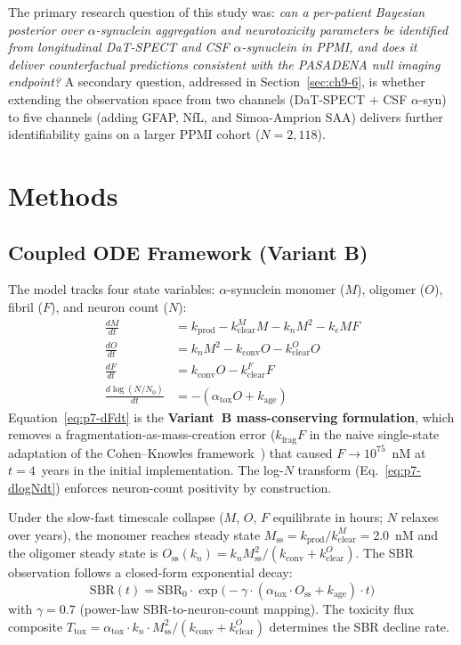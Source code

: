 The primary research question of this study was: \emph{can a per-patient Bayesian posterior over $\alpha$-synuclein aggregation and neurotoxicity parameters be identified from longitudinal DaT-SPECT and CSF $\alpha$-synuclein in PPMI, and does it deliver counterfactual predictions consistent with the PASADENA null imaging endpoint?} A secondary question, addressed in Section~\ref{sec:ch9-6}, is whether extending the observation space from two channels (DaT-SPECT + CSF $\alpha$-syn) to five channels (adding GFAP, NfL, and Simoa-Amprion SAA) delivers further identifiability gains on a larger PPMI cohort ($N = 2{,}118$).


\section{Methods}
\label{sec:p7-methods}

\subsection{Coupled ODE Framework (Variant B)}

The model tracks four state variables: $\alpha$-synuclein monomer ($M$), oligomer ($O$), fibril ($F$), and neuron count ($N$):
\begin{align}
\frac{dM}{dt} &= k_\text{prod} - k_\text{clear}^M M - k_n M^2 - k_e M F \label{eq:p7-dMdt} \\
\frac{dO}{dt} &= k_n M^2 - k_\text{conv} O - k_\text{clear}^O O \label{eq:p7-dOdt} \\
\frac{dF}{dt} &= k_\text{conv} O - k_\text{clear}^F F \label{eq:p7-dFdt} \\
\frac{d\log(N/N_0)}{dt} &= -(\alpha_\text{tox} O + k_\text{age}) \label{eq:p7-dlogNdt}
\end{align}
Equation~\eqref{eq:p7-dFdt} is the \textbf{Variant~B mass-conserving formulation}, which removes a fragmentation-as-mass-creation error ($k_\text{frag} F$ in the naive single-state adaptation of the Cohen--Knowles framework~\cite{cohen2012,knowles2009}) that caused $F \to 10^{75}$~nM at $t=4$~years in the initial implementation. The log-$N$ transform (Eq.~\eqref{eq:p7-dlogNdt}) enforces neuron-count positivity by construction.

Under the slow-fast timescale collapse ($M$, $O$, $F$ equilibrate in hours; $N$ relaxes over years), the monomer reaches steady state $M_\text{ss} = k_\text{prod}/k_\text{clear}^M = 2.0$~nM and the oligomer steady state is $O_\text{ss}(k_n) = k_n M_\text{ss}^2 / (k_\text{conv} + k_\text{clear}^O)$. The SBR observation follows a closed-form exponential decay:
\begin{equation}
\text{SBR}(t) = \text{SBR}_0 \cdot \exp\bigl(-\gamma \cdot (\alpha_\text{tox} \cdot O_\text{ss} + k_\text{age}) \cdot t\bigr)
\label{eq:p7-sbr-decay}
\end{equation}
with $\gamma = 0.7$ (power-law SBR-to-neuron-count mapping). The toxicity flux composite $T_\text{tox} = \alpha_\text{tox} \cdot k_n \cdot M_\text{ss}^2 / (k_\text{conv} + k_\text{clear}^O)$ determines the SBR decline rate.

